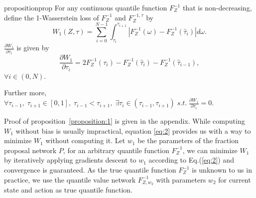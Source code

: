 \documentclass{article}
\begin{document}
\begin{restatable}{proposition}{prop}
\label{proposition:1}
For any continuous quantile function $F^{-1}_{Z}$ that is non-decreasing, define the 1-Wasserstein loss of $F^{-1}_{Z}$ and $F^{-1,\tau}_{Z}$ by
\begin{equation}
\label{objective}
    W_{1}(Z, \tau)=\sum_{i=0}^{N-1} \int_{\tau_{i}}^{\tau_{i+1}}\left|F^{-1}_{Z}(\omega)-F^{-1}_{Z}(\hat{\tau}_i)\right| d \omega.
\end{equation}
$\frac{\partial W_{1}}{\partial \tau_i}$ is given by 
\begin{equation}
\label{eq:2}
    \frac{\partial W_{1}}{\partial \tau_i}=2F^{-1}_{Z}(\tau_{i})-F^{-1}_{Z}(\hat{\tau}_i)-F^{-1}_{Z}(\hat{\tau}_{i-1}), 
\end{equation}
$\forall i\in (0, N)$. 

Further more, $\forall \tau_{i-1},\; \tau_{i+1}\in[0,1],\; \tau_{i-1}<\tau_{i+1},\; \exists \tau_i \in (\tau_{i-1}, \tau_{i+1})\; s.t.\; \frac{\partial W_{1}}{\partial \tau_i}=0$.
\end{restatable}




Proof of proposition~\ref{proposition:1} is given in the appendix. While computing $W_1$ without bias is usually impractical, equation \ref{eq:2} provides us with a way to minimize $W_1$ without computing it. Let $w_1$ be the parameters of the fraction proposal network $P$, for an arbitrary quantile function $F_Z^{-1}$, we can minimize $W_1$ by iteratively applying gradients descent to $w_1$ according to Eq.(\ref{eq:2}) and convergence is guaranteed. As the true quantile function $F^{-1}_{Z}$ is unknown to us in practice, we use the quantile value network $F^{-1}_{Z,w_2}$ with parameters $w_2$ for current state and action as true quantile function. 

\iffalse
Denote the $i$-th output of the fraction proposal network $\tau_{w_1}$ that takes $(x,a)$ as input by $\tau_{i,w_1}$ and for simplicity $\hat{\tau}_{i,w_1}=\frac{\tau_{i,w_1}+\tau_{i+1,w_1}}{2}$. Following equation \ref{eq:2} the gradient for the output of network $\tau_{w_1}$ is given by
\begin{equation*}
        \frac{\partial W_{1}}{\partial \tau_{i,w_1}}=2F^{-1}_{Z,w_2}(\tau_{i,w_1})-F^{-1}_{Z,w_2}(\hat{\tau}_{i,w_1})-F^{-1}_{Z,w_2}(\hat{\tau}_{i-1,w_1}),
\end{equation*}
where $Z$ is the random variable denoting the action-value at $(x,a)$. 

Then the loss of $\tau_{w_1}$ is given by
\begin{equation*}
        \mathcal{L}_{w_1}(x, a)=\sum_{i=1}^{N-1}[2F^{-1}_{Z,w_2}(\tau_{i,w_1})-F^{-1}_{Z,w_2}(\hat{\tau}_{i,w_1})-F^{-1}_{Z,w_2}(\hat{\tau}_{i-1,w_1})]^2,
\end{equation*}
where $Z$ is the random variable denoting the action-value at $(x,a)$, a toy case using $\mathcal{L}_{w_1}$ to approximate a known distribution is given in the appendix. By minimizing $\mathcal{L}_{w_1}(x, a)$, we train the fraction proposal network to obtain the optimal probabilities $\tau$ that minimizes Eq.(\ref{objective}).
\fi
\end{document}
